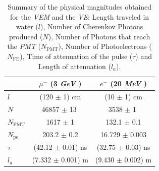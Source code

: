 \documentclass[submitting]{nst}
\begin{document}
\begin{table}[h!]
\label{t:comparacion}
\centering
\caption{Summary of the physical magnitudes obtained for the \textsl{VEM} and the \textsl{VE}: Length traveled in water ($l$), Number of Cherenkov Photons produced ($N$), Number of Photons that reach the \textsl{PMT} ($N_{\mathrm{PMT}}$), Number of Photoelectrons ($N_{\mathrm{FE}}$), Time of attenuation of the pulse ($\tau $) and Length of attenuation ($l_a$).}

\begin{tabular}{l|c|c|}
\cline{2-3}
                                                     & \textbf{$\mu^-$ (3   \textsl{GeV} ) }& \textbf{$e^-$ (20   \textsl{MeV} )} \\ \hline
\multicolumn{1}{|l|}{\textbf{$l$}}   &          (120 $\pm$ 1) cm      &    (10 $\pm$ 1) cm        \\ \hline
\multicolumn{1}{|l|}{\textbf{$N$}}    &         46857 $\pm$ 13 $ $   &      3538 $\pm$ 1 $ $      \\ \hline
\multicolumn{1}{|l|}{$N_{\mathrm{PMT}}$}       &          1617 $\pm$ 1     &     132.1 $\pm$ 0.1      \\ \hline
\multicolumn{1}{|l|}{$N_{\mathrm{pe}}$}       &          203.2 $\pm$ 0.2      &     16.729 $\pm$ 0.003       \\ \hline
\multicolumn{1}{|l|}{$\tau$} &          (42.12 $\pm$ 0.01) ns      &      (32.75 $\pm$ 0.03) ns      \\ \hline
\multicolumn{1}{|l|}{$l_a$} &          (7.332 $\pm$ 0.001) m      &      (9.430 $\pm$ 0.002) m      \\ \hline
\end{tabular}
\end{table}

\end{document}
